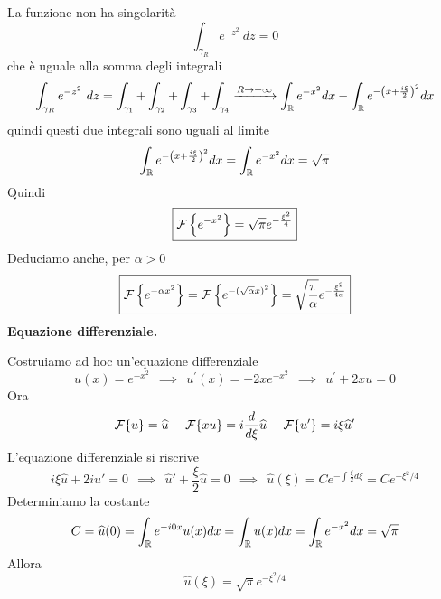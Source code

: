 La funzione non ha singolarità
\begin{equation*}
\int_{\gamma_{R}} e^{- z^{2}} \ dz = 0
\end{equation*}
che è uguale alla somma degli integrali
\begin{equation*}
\int_{\gamma_{R}} e^{- z^{2}} \ dz = \int_{\gamma_{1}} + \int_{\gamma_{2}} + \int_{\gamma_{3}} + \int_{\gamma_{4}}\xrightarrow{R\rightarrow + \infty}\int_{\mathbb{R}} e^{- x^{2}} dx - \int_{\mathbb{R}} e^{- \left(x + \frac{i\xi}{2}\right)^{2}} dx
\end{equation*}
quindi questi due integrali sono uguali al limite
\begin{equation*}
\int_{\mathbb{R}} e^{- \left(x + \frac{i\xi}{2}\right)^{2}} dx = \int_{\mathbb{R}} e^{- x^{2}} dx = \sqrt{\pi}
\end{equation*}
Quindi
\begin{equation*}
\boxed{\mathcal{F} \left\{e^{- x^{2}}\right\} = \sqrt{\pi} e^{- \frac{\xi^{2}}{4}}}
\end{equation*}
Deduciamo anche, per $\alpha  > 0$
\begin{equation*}
\boxed{\mathcal{F} \left\{e^{- \alpha x^{2}}\right\} = \mathcal{F} \left\{e^{- (\sqrt{\alpha} x)^{2}}\right\} = \sqrt{\frac{\pi}{\alpha}} e^{- \frac{\xi^{2}}{4\alpha}}}
\end{equation*}
\textbf{Equazione differenziale.}

Costruiamo ad hoc un'equazione differenziale
\begin{equation*}
u(x) = e^{- x^{2}} \ \ \implies \ \ u^{'} (x) = -2xe^{- x^{2}} \ \ \implies \ \ u^{'} + 2xu = 0
\end{equation*}
Ora
\begin{equation*}
\mathcal{F} \{u\} = \widehat{u} \ \ \ \ \mathcal{F} \{xu\} = i\frac{d}{d\xi}\widehat{u} \ \ \ \ \mathcal{F} \{u'\} = i\xi \widehat{u} '
\end{equation*}
L'equazione differenziale si riscrive
\begin{equation*}
i\xi \hat{u} + 2i\hat{u} ' = 0\ \ \implies \ \ \hat{u} ' + \frac{\xi}{2}\hat{u} = 0\ \ \implies \ \ \hat{u}(\xi) = Ce^{- \int \frac{\xi}{2} d\xi} = Ce^{- \xi^{2} /4}
\end{equation*}
Determiniamo la costante
\begin{equation*}
C = \widehat{u}(0) = \int_{\mathbb{R}} e^{- i0x} u(x) dx = \int_{\mathbb{R}} u(x) dx = \int_{\mathbb{R}} e^{- x^{2}} dx = \sqrt{\pi}
\end{equation*}
Allora
\begin{equation*}
\boxed{\hat{u}(\xi) = \sqrt{\pi} e^{- \xi^{2} /4}}
\end{equation*}
\Soluzione

